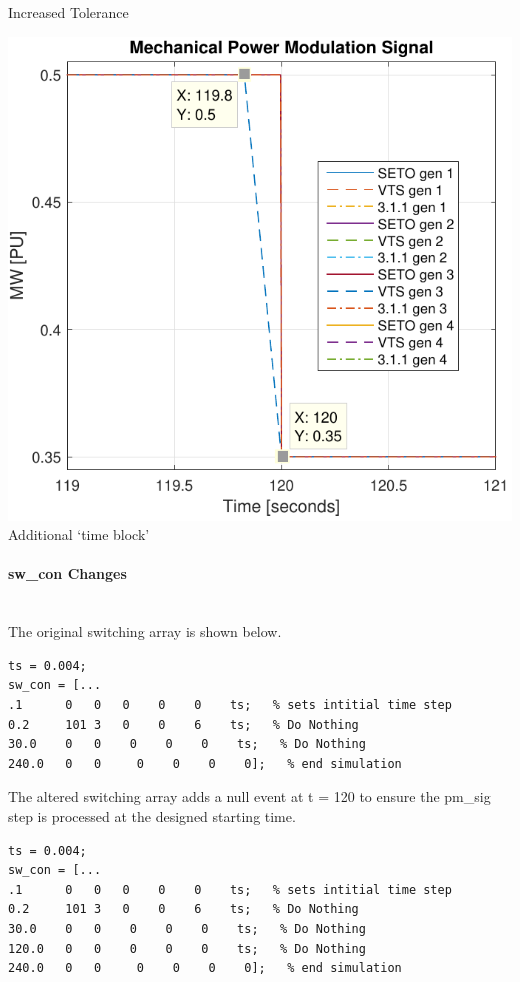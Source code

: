 \documentclass[12pt]{article}
\begin{document}
\begin{center}
\begin{minipage}{.3\linewidth}
\centering
Increased Tolerance
\end{minipage} %
\begin{minipage}{.3\linewidth}
\includegraphics[width=\linewidth]{pmSig_2}
\centering
Additional `time block'
\end{minipage}
\end{center}
\pagebreak
\paragraph{sw\_con Changes} \ \\
The original switching array is shown below.
\begin{verbatim}
ts = 0.004;
sw_con = [...
.1      0  	0  	0    0    0    ts;   % sets intitial time step
0.2     101	3  	0    0    6    ts;   % Do Nothing
30.0    0  	0 	 0    0    0    ts;   % Do Nothing
240.0   0  	0	  0    0    0    0];   % end simulation
\end{verbatim}
The altered switching array adds a null event at t = 120 to ensure the pm\_sig step is processed at the designed starting time.

\begin{verbatim}
ts = 0.004;
sw_con = [...
.1      0  	0  	0    0    0    ts;   % sets intitial time step
0.2     101	3  	0    0    6    ts;   % Do Nothing
30.0    0  	0 	 0    0    0    ts;   % Do Nothing
120.0   0  	0 	 0    0    0    ts;   % Do Nothing
240.0   0  	0	  0    0    0    0];   % end simulation
\end{verbatim}
\end{document}
